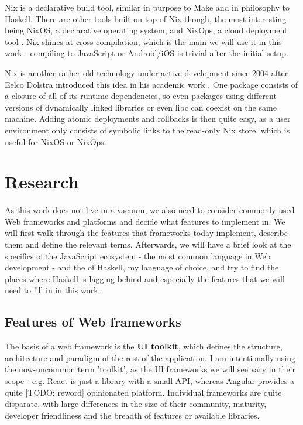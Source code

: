 \documentclass[english,odsaz]{fitthesis}
\begin{document}
Nix is a declarative build tool, similar in purpose to Make and in philosophy to
Haskell. There are other tools built on top of Nix though, the most interesting
being NixOS, a declarative operating system, and NixOps, a cloud deployment tool
\cite{dolstra2008nixos}. Nix shines at cross-compilation, which is the main we
will use it in this work - compiling to JavaScript or Android/iOS is trivial
after the initial setup.

Nix is another rather old technology under active development since 2004 after
Eelco Dolstra introduced this idea in his academic work
\cite{dolstra2006purely}. One package consists of a closure of all of its runtime
dependencies, so even packages using different versions of dynamically linked
libraries or even libc can coexist on the same machine. Adding atomic
deployments and rollbacks is then quite easy, as a user environment only
consists of symbolic links to the read-only Nix store, which is useful for NixOS
or NixOps.

\chapter{Research}
\label{sec:org18656b3}
As this work does not live in a vacuum, we also need to consider commonly used
Web frameworks and platforms and decide what features to implement in. We will
first walk through the features that frameworks today implement, describe them
and define the relevant terms. Afterwards, we will have a brief look at the
specifics of the JavaScript ecosystem - the most common language in Web
development - and the of Haskell, my language of choice, and try to find the
places where Haskell is lagging behind and especially the features that we will
need to fill in in this work.

\section{Features of Web frameworks}
\label{sec:orgd006055}
The basis of a web framework is the \textbf{UI toolkit}, which defines the structure,
architecture and paradigm of the rest of the application. I am intentionally
using the now-uncommon term 'toolkit', as the UI frameworks we will see vary in
their scope - e.g. React is just a library with a small API, whereas Angular
provides a quite [TODO: reword] opinionated platform. Individual frameworks are
quite disparate, with large differences in the size of their community,
maturity, developer friendliness and the breadth of features or available
libraries.
\end{document}
